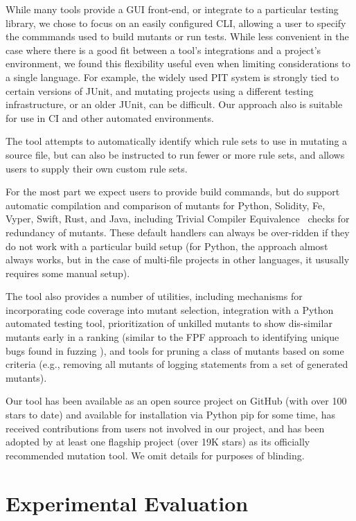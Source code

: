 \documentclass[sigconf,review, anonymous]{acmart}
\begin{document}
{While many tools provide a GUI front-end, or integrate to a particular
testing library, we chose to focus on an easily configured CLI,
allowing a user to specify the commmands used to build mutants or
run tests.  While less convenient in the case where there is a good
fit between a tool's integrations and a project's environment, we
found this flexibility useful even when limiting considerations to a
single language.  For example, the widely used PIT system is strongly tied to
certain versions of JUnit, and mutating projects using a different
testing infrastructure, or an older JUnit, can be difficult.  Our
approach also is suitable for use in CI and other automated
environments.

The tool attempts to automatically identify which rule sets to use in
mutating a source file, but can also be instructed to run fewer or
more rule sets, and allows users to supply their own custom rule sets.

For the most part we expect users to provide build commands, but do
support automatic compilation and comparison of mutants for Python,
Solidity, Fe, Vyper, Swift, Rust, and Java, including Trivial Compiler
Equivalence~\cite{TCE} checks for redundancy of mutants.  These
default handlers can always be over-ridden if they do not work with a
particular build setup (for Python, the approach almost always works,
but in the case of multi-file projects in other languages, it ususally
requires some manual setup).

The tool also provides a number of utilities, including mechanisms for
incorporating code coverage into mutant selection, integration with a
Python automated testing tool, prioritization of unkilled mutants to
show dis-similar mutants early in a ranking (similar to the FPF
approach to identifying unique bugs found in fuzzing
\cite{10.1145/2491956.2462173}), and tools for pruning a class of
mutants based on some criteria (e.g., removing all mutants of logging
statements from a set of generated mutants).

Our tool has been available as an open source project on GitHub (with
over 100 stars to date) and
available for installation via Python pip for
some time, has received contributions from users not involved in
our project, and has been adopted by at least one flagship project
(over 19K stars) as
its officially recommended mutation tool.  We omit details for
purposes of blinding.

\section{Experimental Evaluation}

}
\end{document}
